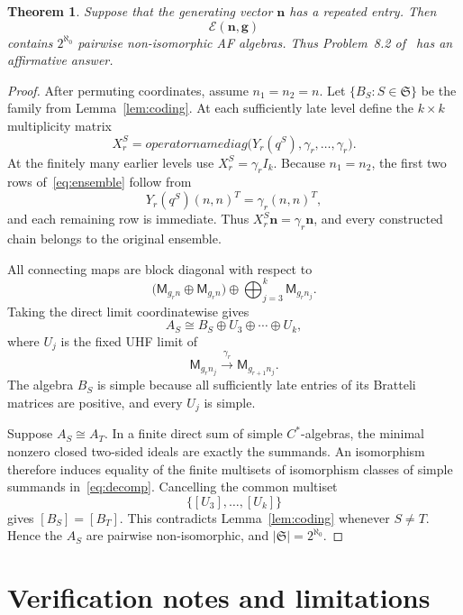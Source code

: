 \documentclass[11pt]{article}
\newtheorem{theorem}{Theorem}
\newcommand{\E}{\mathcal E}
\newcommand{\M}{\mathsf M}
\begin{document}
\begin{theorem}\label{thm:main}
Suppose that the generating vector $\mathbf n$ has a repeated entry. Then
\[
  \E(\mathbf n,\mathbf g)
\]
contains $2^{\aleph_0}$ pairwise non-isomorphic AF algebras. Thus Problem~8.2 of~\cite{source} has an affirmative answer.
\end{theorem}

\begin{proof}
After permuting coordinates, assume $n_1=n_2=n$. Let $\{B_S:S\in\mathfrak S\}$ be the family from Lemma~\ref{lem:coding}. At each sufficiently late level define the $k\times k$ multiplicity matrix
\begin{equation}\label{eq:bigblock}
  X_r^S=operatorname{diag}\bigl(Y_r(q^S),\gamma_r,\ldots,\gamma_r\bigr).
\end{equation}
At the finitely many earlier levels use $X_r^S=\gamma_r I_k$. Because $n_1=n_2$, the first two rows of~\eqref{eq:ensemble} follow from
\[
  Y_r(q^S)(n,n)^T=\gamma_r(n,n)^T,
\]
and each remaining row is immediate. Thus $X_r^S\mathbf n=\gamma_r\mathbf n$, and every constructed chain belongs to the original ensemble.

All connecting maps are block diagonal with respect to
\[
  \bigl(\M_{g_rn}\oplus\M_{g_rn}\bigr)
  \oplus\bigoplus_{j=3}^k\M_{g_rn_j}.
\]
Taking the direct limit coordinatewise gives
\begin{equation}\label{eq:decomp}
  A_S\cong B_S\oplus U_3\oplus\cdots\oplus U_k,
\end{equation}
where $U_j$ is the fixed UHF limit of
\[
  \M_{g_rn_j}\xrightarrow{\,\gamma_r\,}\M_{g_{r+1}n_j}.
\]
The algebra $B_S$ is simple because all sufficiently late entries of its Bratteli matrices are positive, and every $U_j$ is simple.

Suppose $A_S\cong A_T$. In a finite direct sum of simple $C^*$-algebras, the minimal nonzero closed two-sided ideals are exactly the summands. An isomorphism therefore induces equality of the finite multisets of isomorphism classes of simple summands in~\eqref{eq:decomp}. Cancelling the common multiset
\[
  \{[U_3],\ldots,[U_k]\}
\]
gives $[B_S]=[B_T]$. This contradicts Lemma~\ref{lem:coding} whenever $S\ne T$. Hence the $A_S$ are pairwise non-isomorphic, and $|\mathfrak S|=2^{\aleph_0}$.
\end{proof}

\section{Verification notes and limitations}
\end{document}
